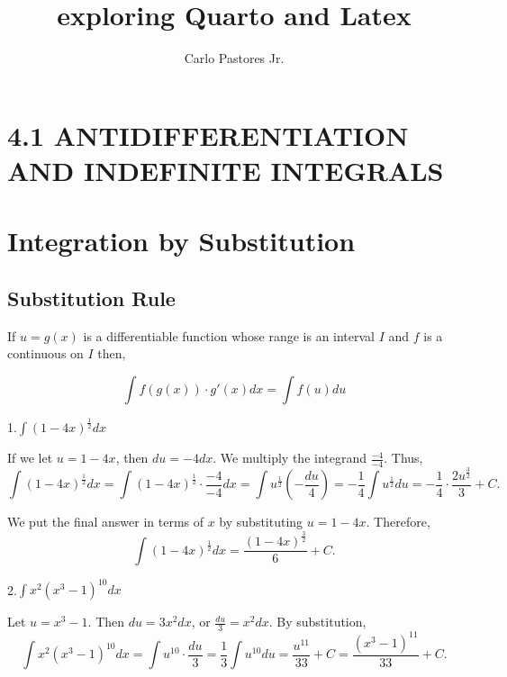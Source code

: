 \documentclass[
  letterpaper,
  DIV=11,
  numbers=noendperiod]{scrartcl}
\title{exploring Quarto and Latex}
\author{Carlo Pastores Jr.}
\date{}
\begin{document}
\maketitle
\ifdefined\Shaded\renewenvironment{Shaded}{\begin{tcolorbox}[borderline west={3pt}{0pt}{shadecolor}, boxrule=0pt, frame hidden, interior hidden, enhanced, breakable, sharp corners]}{\end{tcolorbox}}\fi

\hypertarget{antidifferentiation-and-indefinite-integrals}{%
\section{4.1 ANTIDIFFERENTIATION AND INDEFINITE
INTEGRALS}\label{antidifferentiation-and-indefinite-integrals}}

\hypertarget{integration-by-substitution}{%
\section{Integration by
Substitution}\label{integration-by-substitution}}

\hypertarget{htm:subrule}{}
\hypertarget{substitution-rule}{%
\subsection{Substitution Rule}\label{substitution-rule}}

If \(u=g(x)\) is a differentiable function whose range is an interval
\(I\) and \(f\) is a continuous on \(I\) then,

\[
\int f(g(x))\cdot g'(x)dx = \int f(u)du
\]

1.\(\int \left(1-4x\right)^\frac{1}{2}dx\)

If we let \(u=1-4x\), then \(du=-4dx\). We multiply the integrand
\(\frac{-4}{-4}\). Thus, \[
\int \left(1-4x\right)^\frac{1}{2}dx = \int \left(1-4x\right)^\frac{1}{2}\cdot \frac{-4}{-4}dx = \int u^\frac{1}{2} \left( -\frac{du}{4} \right)= -\frac{1}{4} \int u^\frac{1}{2} du = -\frac{1}{4}\cdot \frac{2u^\frac{3}{2}}{3} + C. \]

We put the final answer in terms of \(x\) by substituting \(u=1-4x\).
Therefore, \[
\int \left(1-4x\right)^\frac{1}{2} dx = \frac{\left(1-4x\right)^\frac{3}{2}}{6} + C.\]

2.\(\int x^2\left(x^3-1\right)^{10} dx\)

Let \(u=x^3-1\). Then \(du=3x^2dx\), or \(\frac{du}{3}=x^2 dx\). By
substitution, \[
\int x^2\left(x^3-1\right)^{10} dx = \int u^{10}\cdot \frac{du}{3}= \frac{1}{3}\int u^{10}du=\frac{u^{11}}{33} + C= \frac{\left(x^3-1\right)^{11}}{33}+ C.
\]
\end{document}
